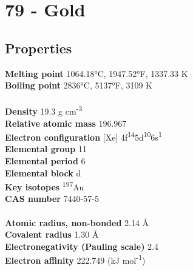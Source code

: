 \section{79 - Gold}
\label{sec:elem-gold}
\subsection{Properties}
\textbf{Melting point} 1064.18°C, 1947.52°F, 1337.33 K\\
\textbf{Boiling point} 2836°C, 5137°F, 3109 K\\
\\
\textbf{Density} 19.3 g cm\textsuperscript{-3}\\
\textbf{Relative atomic mass} 196.967\\
\textbf{Electron configuration} [Xe] 4f\textsuperscript{14}5d\textsuperscript{10}6s\textsuperscript{1}\\
\textbf{Elemental group} 11\\
\textbf{Elemental period} 6\\
\textbf{Elemental block} d\\
\textbf{Key isotopes} \textsuperscript{197}Au\\
\textbf{CAS number} 7440-57-5\\
\\
\textbf{Atomic radius, non-bonded} 2.14 Å\\
\textbf{Covalent radius} 1.30 Å\\
\textbf{Electronegativity (Pauling scale)} 2.4\\
\textbf{Electron affinity} 222.749 (kJ mol\textsuperscript{-1})\\